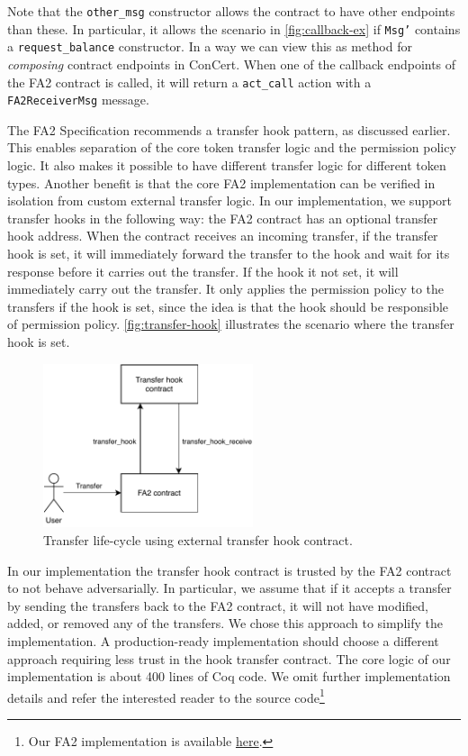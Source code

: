 \documentclass[twoside,11pt,openright]{report}
\newcommand{\coq}[1]{\texttt{#1}}
\begin{document}
Note that the \coq{other\_msg} constructor allows the contract to have other endpoints than these. In particular, it allows the scenario in \autoref{fig:callback-ex} if \coq{Msg'} contains a \coq{request\_balance} constructor. In a way we can view this as method for \textit{composing} contract endpoints in ConCert. When one of the callback endpoints of the FA2 contract is called, it will return a \coq{act\_call} action with a \coq{FA2ReceiverMsg} message.

The FA2 Specification recommends a transfer hook pattern, as discussed earlier. This enables separation of the core token transfer logic and the permission policy logic. It also makes it possible to have different transfer logic for different token types. Another benefit is that the core FA2 implementation can be verified in isolation from custom external transfer logic. In our implementation, we support transfer hooks in the following way: the FA2 contract has an optional transfer hook address. When the contract receives an incoming transfer, if the transfer hook is set, it will immediately forward the transfer to the hook and wait for its response before it carries out the transfer. If the hook it not set, it will immediately carry out the transfer. It only applies the permission policy to the transfers if the hook is set, since the idea is that the hook should be responsible of permission policy. \autoref{fig:transfer-hook} illustrates the scenario where the transfer hook is set.
\begin{figure}[h]
\begin{center}
\includegraphics[width=0.55\textwidth]{media/fa2_transfer_hook.pdf}
\end{center}
\caption{Transfer life-cycle using external transfer hook contract.}
\label{fig:transfer-hook}
\end{figure}
In our implementation the transfer hook contract is trusted by the FA2 contract to not behave adversarially. In particular, we assume that if it accepts a transfer by sending the transfers back to the FA2 contract, it will not have modified, added, or removed any of the transfers. We chose this approach to simplify the implementation. A production-ready implementation should choose a different approach requiring less trust in the hook transfer contract. The core logic of our implementation is about 400 lines of Coq code. We omit further implementation details and refer the interested reader to the source code\footnote{Our FA2 implementation is available \href{https://github.com/mikkelmilo/ConCert/blob/master/execution/theories/Examples/FA2Token.v}{here}.}
\end{document}
